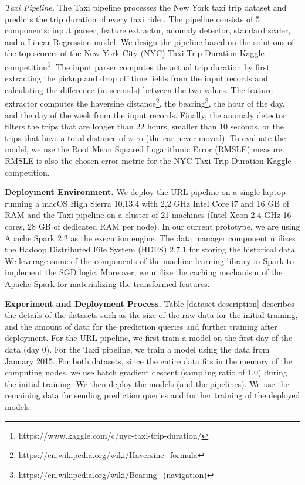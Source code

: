 \textit{Taxi Pipeline.} The Taxi pipeline processes the New York taxi trip dataset and predicts the trip duration of every taxi ride \cite{newyork-taxi}. 
The pipeline consists of 5 components: input parser, feature extractor, anomaly detector, standard scaler, and a Linear Regression model.
We design the pipeline based on the solutions of the top scorers of the New York City (NYC) Taxi Trip Duration Kaggle competition\footnote{https://www.kaggle.com/c/nyc-taxi-trip-duration/}. 
The input parser computes the actual trip duration by first extracting the pickup and drop off time fields from the input records and calculating the difference (in seconds) between the two values.
The feature extractor computes the haversine distance\footnote{https://en.wikipedia.org/wiki/Haversine\_formula}, the bearing\footnote{https://en.wikipedia.org/wiki/Bearing\_(navigation)}, the hour of the day, and the day of the week from the input records. 
Finally, the anomaly detector filters the trips that are longer than 22 hours, smaller than 10 seconds, or the trips that have a total distance of zero (the car never moved).
To evaluate the model, we use the Root Mean Squared Logarithmic Error (RMSLE) measure.
RMSLE is also the chosen error metric for the NYC Taxi Trip Duration Kaggle competition.

\textbf{Deployment Environment. }
We deploy the URL pipeline on a single laptop running a macOS High Sierra 10.13.4 with 2,2 GHz Intel Core i7 and 16 GB of RAM and the Taxi pipeline on a cluster of 21 machines (Intel Xeon 2.4 GHz 16 cores, 28 GB of dedicated RAM per node).
In our current prototype, we are using Apache Spark 2.2 as the execution engine.
The data manager component utilizes the Hadoop Distributed File System (HDFS) 2.7.1 for storing the historical data \cite{shvachko2010hadoop}.
We leverage some of the components of the machine learning library in Spark to implement the SGD logic.
Moreover, we utilize the caching mechanism of the Apache Spark for materializing the transformed features.

\textbf{Experiment and Deployment Process. }
Table \ref{dataset-description} describes the details of the datasets such as the size of the raw data for the initial training, and the amount of data for the prediction queries and further training after deployment. 
For the URL pipeline, we first train a model on the first day of the data (day 0).
For the Taxi pipeline, we train a model using the data from January 2015.
For both datasets, since the entire data fits in the memory of the computing nodes, we use batch gradient descent (sampling ratio of 1.0) during the initial training.
We then deploy the models (and the pipelines).
We use the remaining data for sending prediction queries and further training of the deployed models.

